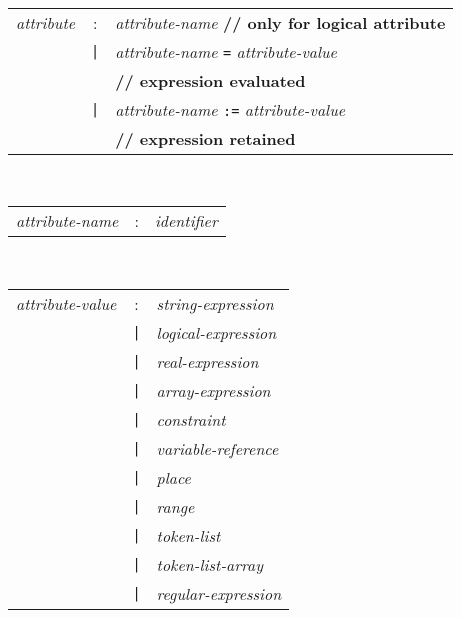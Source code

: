 \\
\begin{tabular}{p{4cm}cl}
\textit{attribute}
  &:& \textit{attribute-name} \textbf{// only for logical attribute} \\
  &\texttt{|}& \textit{attribute-name} \texttt{=} \textit{attribute-value}
    \\
 & &\textbf{// expression evaluated} \\
  &\texttt{|}& \textit{attribute-name} \texttt{:=} \textit{attribute-value} \\
 & &\textbf{// expression retained}
\end{tabular}
\\
\begin{tabular}{p{4cm}cl}
\textit{attribute-name}
  &:& \textit{identifier}
\end{tabular}
\\
\begin{tabular}{p{4cm}cl}
\textit{attribute-value}
  &:& \textit{string-expression} \\
  &\texttt{|}& \textit{logical-expression} \\
  &\texttt{|}& \textit{real-expression} \\
  &\texttt{|}& \textit{array-expression} \\
  &\texttt{|}& \textit{constraint} \\
  &\texttt{|}& \textit{variable-reference} \\
  &\texttt{|}& \textit{place} \\
  &\texttt{|}& \textit{range} \\
  &\texttt{|}& \textit{token-list} \\
  &\texttt{|}& \textit{token-list-array} \\
  &\texttt{|}& \textit{regular-expression}
\end{tabular}

